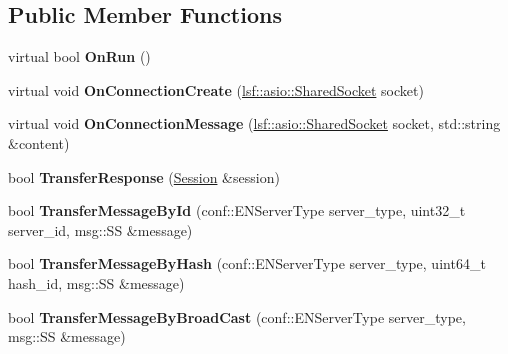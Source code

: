 \subsection*{Public Member Functions}
\begin{DoxyCompactItemize}
\item 
\hypertarget{classConnectServerMsgTransferService_afce131ed9ef093e45ae13f816298708d}{
virtual bool {\bfseries OnRun} ()}
\label{classConnectServerMsgTransferService_afce131ed9ef093e45ae13f816298708d}

\item 
\hypertarget{classConnectServerMsgTransferService_a1510f05686d809bb313ca15f2844c6bc}{
virtual void {\bfseries OnConnectionCreate} (\hyperlink{classlsf_1_1asio_1_1SharedSocket}{lsf::asio::SharedSocket} socket)}
\label{classConnectServerMsgTransferService_a1510f05686d809bb313ca15f2844c6bc}

\item 
\hypertarget{classConnectServerMsgTransferService_adbf191f7cff70b809b4b19243c86d206}{
virtual void {\bfseries OnConnectionMessage} (\hyperlink{classlsf_1_1asio_1_1SharedSocket}{lsf::asio::SharedSocket} socket, std::string \&content)}
\label{classConnectServerMsgTransferService_adbf191f7cff70b809b4b19243c86d206}

\item 
\hypertarget{classConnectServerMsgTransferService_a13afbeeb9c1fc543366c4afbcf6b9244}{
bool {\bfseries TransferResponse} (\hyperlink{classSession}{Session} \&session)}
\label{classConnectServerMsgTransferService_a13afbeeb9c1fc543366c4afbcf6b9244}

\item 
\hypertarget{classConnectServerMsgTransferService_a0c3094283f97a113fa3ea5f6f70dbab0}{
bool {\bfseries TransferMessageById} (conf::ENServerType server\_\-type, uint32\_\-t server\_\-id, msg::SS \&message)}
\label{classConnectServerMsgTransferService_a0c3094283f97a113fa3ea5f6f70dbab0}

\item 
\hypertarget{classConnectServerMsgTransferService_ab22ecb9e2f40e8993b7f8e0489948653}{
bool {\bfseries TransferMessageByHash} (conf::ENServerType server\_\-type, uint64\_\-t hash\_\-id, msg::SS \&message)}
\label{classConnectServerMsgTransferService_ab22ecb9e2f40e8993b7f8e0489948653}

\item 
\hypertarget{classConnectServerMsgTransferService_ad6f0bdbcd7fd8aac198497c29e91fbd0}{
bool {\bfseries TransferMessageByBroadCast} (conf::ENServerType server\_\-type, msg::SS \&message)}
\label{classConnectServerMsgTransferService_ad6f0bdbcd7fd8aac198497c29e91fbd0}


\end{DoxyCompactItemize}
